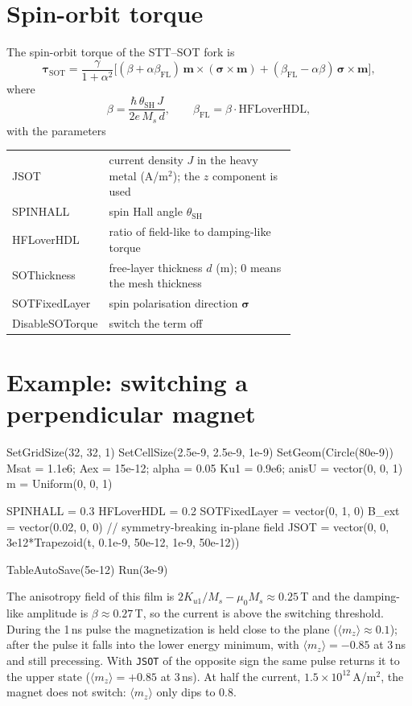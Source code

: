 \documentclass[11pt,a4paper,oneside]{book}
\newcommand{\code}[1]{\texttt{#1}}
\renewcommand{\_}{\textunderscore\allowbreak}
\begin{document}
\section{Spin-orbit torque}

The spin-orbit torque of the STT--SOT fork is
\begin{equation}
\boldsymbol\tau_\text{SOT} = \frac{\gamma}{1+\alpha^2}\Big[(\beta+\alpha\beta_\text{FL})\,
 \mathbf m\times(\boldsymbol\sigma\times\mathbf m) + (\beta_\text{FL}-\alpha\beta)\,\boldsymbol\sigma\times\mathbf m\Big],
\end{equation}
where
\begin{equation}
\beta = \frac{\hbar\,\theta_\text{SH}\,J}{2e\,M_s\,d},\qquad \beta_\text{FL} = \beta\cdot\text{HFLoverHDL},
\end{equation}
with the parameters
\begin{center}
\begin{tabular}{>{\ttfamily}l p{0.7\linewidth}}
\toprule
JSOT & current density $J$ in the heavy metal (A/m$^2$); the $z$ component is used \\
SPINHALL & spin Hall angle $\theta_\text{SH}$ \\
HFLoverHDL & ratio of field-like to damping-like torque \\
SOThickness & free-layer thickness $d$ (m); 0 means the mesh thickness \\
SOTFixedLayer & spin polarisation direction $\boldsymbol\sigma$ \\
DisableSOTorque & switch the term off \\
\bottomrule
\end{tabular}
\end{center}

\section{Example: switching a perpendicular magnet}

\begin{mxcode}
SetGridSize(32, 32, 1)
SetCellSize(2.5e-9, 2.5e-9, 1e-9)
SetGeom(Circle(80e-9))
Msat = 1.1e6;  Aex = 15e-12;  alpha = 0.05
Ku1 = 0.9e6;   anisU = vector(0, 0, 1)
m = Uniform(0, 0, 1)

SPINHALL      = 0.3
HFLoverHDL    = 0.2
SOTFixedLayer = vector(0, 1, 0)
B_ext = vector(0.02, 0, 0)                     // symmetry-breaking in-plane field
JSOT  = vector(0, 0, 3e12*Trapezoid(t, 0.1e-9, 50e-12, 1e-9, 50e-12))

TableAutoSave(5e-12)
Run(3e-9)
\end{mxcode}
The anisotropy field of this film is $2K_{u1}/M_s - \mu_0 M_s \approx 0.25$\,T and the damping-like amplitude
is $\beta \approx 0.27$\,T, so the current is above the switching threshold. During the 1\,ns pulse the
magnetization is held close to the plane ($\langle m_z\rangle \approx 0.1$); after the pulse it falls into the
lower energy minimum, with $\langle m_z\rangle = -0.85$ at 3\,ns and still precessing. With \code{JSOT} of the
opposite sign the same pulse returns it to the upper state ($\langle m_z\rangle = +0.85$ at 3\,ns). At half the
current, $1.5\times10^{12}$\,A/m$^2$, the magnet does not switch: $\langle m_z\rangle$ only dips to $0.8$.
\end{document}
